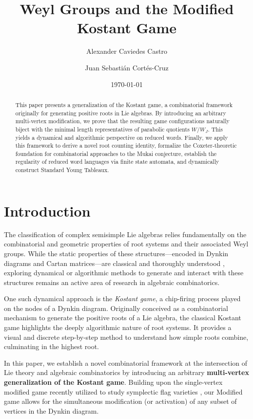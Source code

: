\documentclass[11pt,a4paper]{amsart}
\title{Weyl Groups and the Modified Kostant Game}
\author[Alexander Caviedes Castro]{Alexander Caviedes Castro}
\author[Juan Sebastián Cortés-Cruz]{Juan Sebastián Cortés-Cruz}
\date{\today}
\theoremstyle{plain}
\theoremstyle{definition}
\theoremstyle{remark}
\begin{document}
	
	\maketitle
	
\begin{abstract}
This paper presents a generalization of the Kostant game, a combinatorial framework originally for generating positive roots in Lie algebras. By introducing an arbitrary multi-vertex modification, we prove that the resulting game configurations naturally biject with the minimal length representatives of parabolic quotients $W/W_J$. This yields a dynamical and algorithmic perspective on reduced words. Finally, we apply this framework to derive a novel root counting identity, formalize the Coxeter-theoretic foundation for combinatorial approaches to the Mukai conjecture, establish the regularity of reduced word languages via finite state automata, and dynamically construct Standard Young Tableaux.
\end{abstract}

\section{Introduction}

The classification of complex semisimple Lie algebras relies fundamentally on the combinatorial and geometric properties of root systems and their associated Weyl groups. While the static properties of these structures—encoded in Dynkin diagrams and Cartan matrices—are classical and thoroughly understood \cite{Humphreys1972}, exploring dynamical or algorithmic methods to generate and interact with these structures remains an active area of research in algebraic combinatorics. 

One such dynamical approach is the \textit{Kostant game}, a chip-firing process played on the nodes of a Dynkin diagram. Originally conceived as a combinatorial mechanism to generate the positive roots of a Lie algebra, the classical Kostant game highlights the deeply algorithmic nature of root systems. It provides a visual and discrete step-by-step method to understand how simple roots combine, culminating in the highest root.

In this paper, we establish a novel combinatorial framework at the intersection of Lie theory and algebraic combinatorics by introducing an arbitrary \textbf{multi-vertex generalization of the Kostant game}. Building upon the single-vertex modified game recently utilized to study symplectic flag varieties \cite{CaviedesCastro2022}, our Modified game allows for the simultaneous modification (or activation) of any subset of vertices in the Dynkin diagram. 
\end{document}
